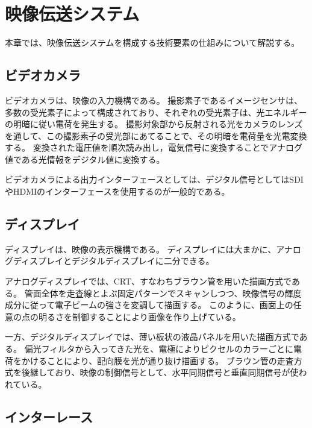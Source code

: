 \chapter{映像伝送システム}
\label{chap:video-transmission}

本章では、映像伝送システムを構成する技術要素の仕組みについて解説する。

\section{ビデオカメラ}
\label{sec:camera}

ビデオカメラは、映像の入力機構である。
撮影素子であるイメージセンサは、多数の受光素子によって構成されており、それぞれの受光素子は、光エネルギーの明暗に従い電荷を発生する。
撮影対象部から反射される光をカメラのレンズを通して、この撮影素子の受光部にあてることで、その明暗を電荷量を光電変換する。
変換された電圧値を順次読み出し，電気信号に変換することでアナログ値である光情報をデジタル値に変換する。

ビデオカメラによる出力インターフェースとしては、デジタル信号としてはSDIやHDMIのインターフェースを使用するのが一般的である。

\section{ディスプレイ}
\label{sec:display}

ディスプレイは、映像の表示機構である。
ディスプレイには大まかに、アナログディスプレイとデジタルディスプレイに二分できる。

アナログディスプレイでは、CRT、すなわちブラウン管を用いた描画方式である。
管面全体を走査線とよぶ固定パターンでスキャンしつつ、映像信号の輝度成分に従って電子ビームの強さを変調して描画する。
このように、画面上の任意の点の明るさを制御することにより画像を作り上げている。

一方、デジタルディスプレイでは、薄い板状の液晶パネルを用いた描画方式である。
偏光フィルタから入ってきた光を、電極によりピクセルのカラーごとに電荷をかけることにより、配向膜を光が通り抜け描画する。
ブ゙ラウン管の走査方式を後継しており、映像の制御信号として、水平同期信号と垂直同期信号が使われている。

\section{インターレース}
\label{sec:interlace}

